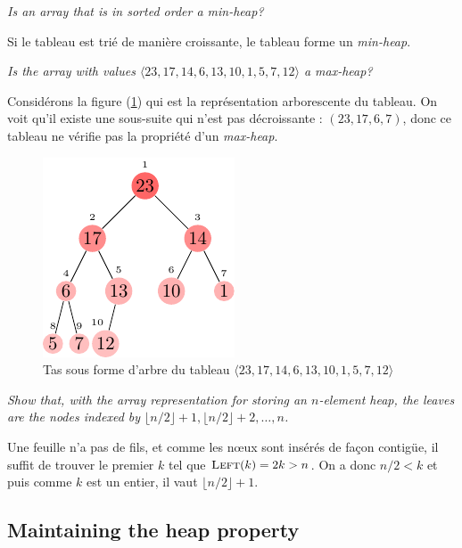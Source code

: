 \begin{description}
\begin{ex}
    \end{ex}
   \textit{Is an array that is in sorted order a min-heap?}
    \begin{ex} %
      Si le tableau est tri\'e de mani\`ere croissante, le tableau forme un \textit{min-heap}.
    \end{ex}
   \textit{Is the array with values $\langle 23, 17, 14, 6, 13, 10, 1, 5, 7, 12\rangle$ a max-heap?}
    \begin{ex}
      Consid\'erons la figure (\ref{fig:6.1-6}) qui est la repr\'esentation arborescente du tableau. On voit qu'il existe une sous-suite qui n'est pas d\'ecroissante : $(23, 17, 6, 7)$, donc ce tableau ne v\'erifie pas la propri\'et\'e d'un \textit{max-heap}.
        \begin{figure}[t]
          \centering
        \includegraphics[scale=1.5]{img/6_1-6/6_1-6.pdf}
        \caption{Tas sous forme d'arbre du tableau $\langle 23, 17, 14, 6, 13, 10, 1, 5, 7, 12\rangle$}
          \label{fig:6.1-6}
        \end{figure}
    \end{ex}
   \textit{Show that, with the array representation for storing an $n$-element heap, the leaves are the nodes indexed by $\lfloor n/2 \rfloor +1, \lfloor n/2\rfloor + 2, \ldots, n$.}
    \begin{ex}
      Une feuille n'a pas de fils, et comme les n\oe ux sont ins\'er\'es de fa\c{c}on contig\"ue, il suffit de trouver le premier    $k$ tel que $\textsc{Left}(k) =2k > n$. On a donc $n/2 < k$ et puis comme $k$ est un entier, il vaut $\lfloor n/2 \rfloor +1$.
    \end{ex}
\end{description}

\subsection{Maintaining the heap property}

